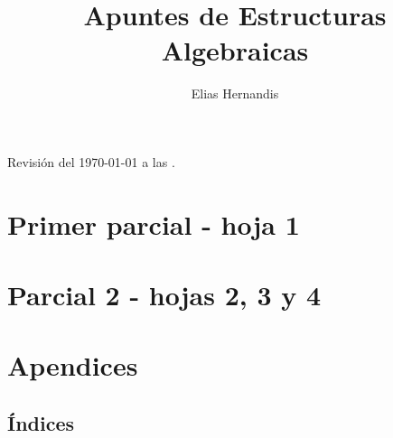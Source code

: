 \documentclass{book}
\title{Apuntes de Estructuras Algebraicas}
\author{Elias Hernandis}
\theoremstyle{definition}
\theoremstyle{remark}
\begin{document}
\maketitle
Revisión del \today $ $ a las \currenttime.

\tableofcontents

\part{Primer parcial - hoja 1}









\part{Parcial 2 - hojas 2, 3 y 4}



	






\part{Apendices}

\chapter{Índices}

\renewcommand{\listtheoremname}{Lista de definiciones}
\listoftheorems[ignore={thm,ej,pro,cor,obs,lem}]

\renewcommand{\listtheoremname}{Lista de teoremas}
\listoftheorems[onlynamed,ignore={dfn,ej,pro,cor,obs,lem}]

\renewcommand{\listtheoremname}{Lista de ejemplos}
\listoftheorems[onlynamed,ignore={dfn,thm,pro,cor,obs,lem}]



\end{document}
